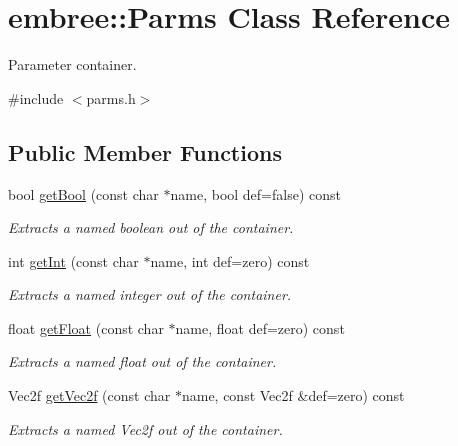 \hypertarget{classembree_1_1_parms}{
\section{embree::Parms Class Reference}
\label{classembree_1_1_parms}
}


Parameter container.  




{\ttfamily \#include $<$parms.h$>$}

\subsection*{Public Member Functions}
\begin{DoxyCompactItemize}
\item 
bool \hyperlink{classembree_1_1_parms_a66d1d0d6754d9dc36ceea267a5c40b99}{getBool} (const char $\ast$name, bool def=false) const 
\begin{DoxyCompactList}\small\item\em Extracts a named boolean out of the container. \item\end{DoxyCompactList}\item 
int \hyperlink{classembree_1_1_parms_abcaa48db7845627de5986fe73d68a06d}{getInt} (const char $\ast$name, int def=zero) const 
\begin{DoxyCompactList}\small\item\em Extracts a named integer out of the container. \item\end{DoxyCompactList}\item 
float \hyperlink{classembree_1_1_parms_aa48aa0635d289433e5339d4307b3b254}{getFloat} (const char $\ast$name, float def=zero) const 
\begin{DoxyCompactList}\small\item\em Extracts a named float out of the container. \item\end{DoxyCompactList}\item 
Vec2f \hyperlink{classembree_1_1_parms_a8dad07314879140e3974e6e2aaf504dc}{getVec2f} (const char $\ast$name, const Vec2f \&def=zero) const 
\begin{DoxyCompactList}\small\item\em Extracts a named Vec2f out of the container. \item\end{DoxyCompactList}\item 

\end{DoxyCompactItemize}
